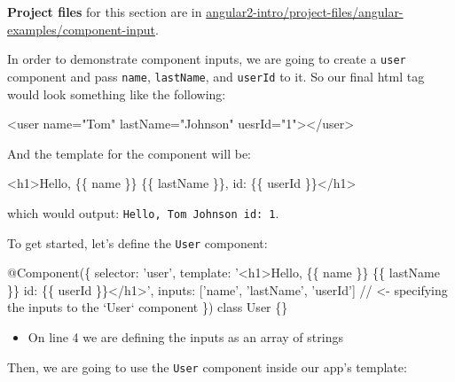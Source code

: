 \documentclass[12pt,]{article}
\newenvironment{Shaded}{}{}
\newcommand{\KeywordTok}[1]{\textcolor[rgb]{0.00,0.00,1.00}{{#1}}}
\newcommand{\StringTok}[1]{\textcolor[rgb]{0.00,0.50,0.50}{{#1}}}
\newcommand{\CommentTok}[1]{\textcolor[rgb]{0.00,0.50,0.00}{{#1}}}
\newcommand{\OtherTok}[1]{\textcolor[rgb]{1.00,0.25,0.00}{{#1}}}
\newcommand{\FunctionTok}[1]{{#1}}
\newcommand{\NormalTok}[1]{{#1}}
\providecommand{\tightlist}{%
  \setlength{\itemsep}{0pt}\setlength{\parskip}{0pt}}
\begin{document}
\textbf{Project files} for this section are in
\href{https://github.com/st32lth/angular2-intro/tree/master/project-files/angular-examples/component-input}{angular2-intro/project-files/angular-examples/component-input}.

In order to demonstrate component inputs, we are going to create a
\texttt{user} component and pass \texttt{name}, \texttt{lastName}, and
\texttt{userId} to it. So our final html tag would look something like
the following:

\begin{Shaded}
\begin{Highlighting}[numbers=left,,]
\KeywordTok{<user}\OtherTok{ name=}\StringTok{"Tom"}\OtherTok{ lastName=}\StringTok{"Johnson"}\OtherTok{ uesrId=}\StringTok{"1"}\KeywordTok{></user>}
\end{Highlighting}
\end{Shaded}

And the template for the component will be:

\begin{Shaded}
\begin{Highlighting}[numbers=left,,]
\KeywordTok{<h1>}\NormalTok{Hello, \{\{ name \}\} \{\{ lastName \}\}, id: \{\{ userId \}\}}\KeywordTok{</h1>}
\end{Highlighting}
\end{Shaded}

which would output: \texttt{Hello,\ Tom\ Johnson\ id:\ 1}.

To get started, let's define the \texttt{User} component:

\begin{Shaded}
\begin{Highlighting}[numbers=left,,]
\FunctionTok{@Component}\NormalTok{(\{}
  \NormalTok{selector: 'user',}
  \NormalTok{template: '<h1>Hello, \{\{ name \}\} \{\{ lastName \}\} id: \{\{ userId \}\}</h1>',}
  \NormalTok{inputs: ['name', 'lastName', 'userId'] }\CommentTok{// <- specifying the inputs to the `User` component}
\NormalTok{\})}
\KeywordTok{class} \NormalTok{User \{\}}
\end{Highlighting}
\end{Shaded}

\begin{itemize}
\tightlist
\item
  On line 4 we are defining the inputs as an array of strings
\end{itemize}

Then, we are going to use the \texttt{User} component inside our app's
template:
\end{document}

